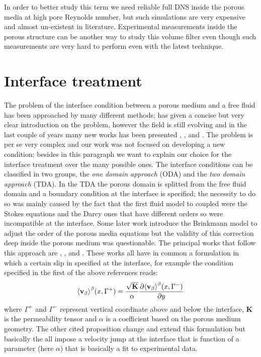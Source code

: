In order to better study this term we need reliable full DNS inside the porous media at high pore Reynolds number, but such simulations are very expensive and almost un-existent in literature.
Experimental measurements inside the porous structure can be another way to study this volume filter even though such measurements are very hard to perform even with the latest technique.

\section{Interface treatment}
\label{ch:interface}

The problem of the interface condition between a porous medium and a free fluid has been approached by many different methods; \citet{ehrhardt2010interface} has given a concise but very clear introduction on the problem, however the field is still evolving and in the last couple of years many new works has been presented \citet{minale2014momentum}, \citet{angot2017asymptotic}, \citet{lacis2017framework} and .
The problem is per se very complex and our work was not focused on developing a new condition; besides in this paragraph we want to explain our choice for the interface treatment over the many possible ones.
The interface conditions can be classified in two groups, the \textit{one domain approach} (ODA) and the \textit{two domain approach} (TDA).
In the TDA the porous domain is splitted from the free fluid domain and a boundary condition at the interface is specified; the necessity to do so was mainly caused by the fact that the first fluid model to coupled were the Stokes equations and the Darcy ones that have different orders so were incompatible at the interface.
Some later work introduce the Brinkmann model to adjust the order of the porous media equations but the validity of this correction deep inside the porous medium was questionable.
The principal works that follow this approach are \citet{beavers1967boundary}, \citet{mikelic2000interface}, \citet{ochoa1995momentum} and \citet{le2006interfacial}.
These works all have in common a formulation in which a certain slip in specified at the interface, for example the condition specified in the first of the above references reads:
$$
{\left< \textbf{v}_{\beta} \right>}^{\beta}(x,\Gamma^+) = \dfrac{\sqrt{\mathbf{K}}}{\alpha} \dfrac{\partial {\left< \textbf{v}_{\beta}\right>}^{\beta}(x, \Gamma^-)}{\partial y}
$$
where $\Gamma^+$ and $\Gamma^-$ represent vertical coordinate above and below the interface, $\mathbf{K}$ is the permeability tensor and $\alpha$ is a coefficient based on the porous medium geometry.
The other cited proposition change and extend this formulation but basically the all impose a velocity jump at the interface that is function of a parameter (here $\alpha$) that is basically a fit to experimental data.

